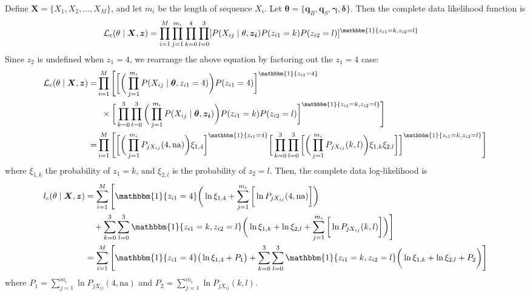 \documentclass[10pt]{article}
\begin{document}
\begin{enumerate}[label = \textbf{\arabic*.}]
        Define $\bm{X} = \{X_1, X_2, \dots, X_M\}$, and let $m_i$ be the length of sequence $X_i$.  Let $\bm{\theta} = \{\bm{q}_B, \bm{q}_S, \bm{\gamma}, \bm{\delta}\}$.  Then the complete data likelihood function is
                \begin{align}
                \mathcal{L}_c(\theta\mid \bm{X}, \bm{z}) &= \prod_{i = 1}^M\prod_{j = 1}^{m_i}\prod_{k = 0}^4\prod_{l = 0}^3[P(X_{ij} \mid \theta, \bm{z_i}) P(z_{i1} = k) P(z_{i2} = l)]^{\mathbbm{1}\{z_{i1} = k, z_{i2} = l\}} 
                \end{align}
        Since $z_2$ is undefined when $z_1 = 4$, we rearrange the above equation by factoring out the $z_1 = 4$ case:
                \begin{align}
                    \mathcal{L}_c(\theta\mid \bm{X}, \bm{z}) = &\prod_{i = 1}^M\Bigg[\bigg[\bigg(\prod_{j = 1}^{m_i}P(X_{ij}\mid \bm{\theta}, z_{i1} = 4)\bigg)P(z_{i1} = 4)\bigg]^{\mathbbm{1}\{z_{i1} = 4\}}\nonumber\\
                    &\ \,\times\bigg[\prod_{k = 0}^3\prod_{l = 0}^3\bigg(\prod_{j = 1}^{m_i}P(X_{ij}\mid \bm{\theta}, \bm{z_i})\bigg)P(z_{i1} = k)P(z_{i2} = l)\bigg]^{\mathbbm{1}\{z_{i1} = k, z_{i2} = l\}}\Bigg]\nonumber\\
                    = &\prod_{i = 1}^M\Bigg[\bigg[\bigg(\prod_{j = 1}^{m_i}P_{jX_{ij}}(4, \text{na})\bigg)\xi_{1, 4}\bigg]^{\mathbbm{1}\{z_{i1} = 4\}}\bigg[\prod_{k = 0}^3\prod_{l = 0}^3\bigg[\bigg(\prod_{j = 1}^{m_i}P_{jX_{ij}}(k, l)\bigg)\xi_{1, k}\xi_{2, l}\bigg]\bigg]^{\mathbbm{1}\{z_{i1} = k, z_{i2} = l\}}\Bigg]
                \end{align}
                where $\xi_{1, k}$ the probability of $z_1 = k$, and $\xi_{2, l}$ is the probability of $z_{2} = l$.
        Then, the complete data log-likelihood is
            \begin{align}\label{eq:cd_loglik}
                l_c(\theta\mid \bm{X}, \bm{z}) &= \sum_{i = 1}^M\Bigg[\mathbbm{1}\{z_{i1} = 4\} \bigg( \ln \xi_{1, 4} +  \sum_{j = 1}^{m_i} \bigg[\ln P_{jX_{ij}}(4, \text{na})\bigg] \bigg)\nonumber\\
                &\quad+ \sum_{k = 0}^3\sum_{l = 0}^3\mathbbm{1}\{z_{i1} = k, z_{i2} = l\}\bigg( \ln \xi_{1, k} + \ln \xi_{2, l} + \sum_{j = 1}^{m_i} \bigg[\ln P_{jX_{ij}}(k, l)\bigg] \bigg)\Bigg]\nonumber\\
                &= \sum_{i = 1}^M\Bigg[\mathbbm{1}\{z_{i1} = 4\}\big(\ln{\xi_{1, 4}} + P_1\big)  + \sum_{k = 0}^3\sum_{l = 0}^3\mathbbm{1}\{z_{i1} = k, z_{i2} = l\}\bigg( \ln \xi_{1, k} + \ln \xi_{2, l} + P_2\bigg)\Bigg]
            \end{align}
        where $P_1 = \sum_{j = 1}^{m_i}\ln P_{jX_{ij}}(4, \text{na})$ and $P_2 = \sum_{j = 1}^{m_i}\ln P_{jX_{ij}}(k, l)$.  
        

\end{enumerate}
\end{document}
